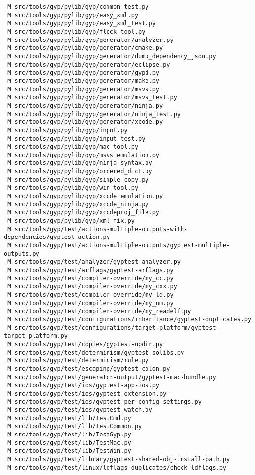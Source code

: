 \documentclass{article}
\begin{document}
\begin{verbatim}
 M src/tools/gyp/pylib/gyp/common_test.py
 M src/tools/gyp/pylib/gyp/easy_xml.py
 M src/tools/gyp/pylib/gyp/easy_xml_test.py
 M src/tools/gyp/pylib/gyp/flock_tool.py
 M src/tools/gyp/pylib/gyp/generator/analyzer.py
 M src/tools/gyp/pylib/gyp/generator/cmake.py
 M src/tools/gyp/pylib/gyp/generator/dump_dependency_json.py
 M src/tools/gyp/pylib/gyp/generator/eclipse.py
 M src/tools/gyp/pylib/gyp/generator/gypd.py
 M src/tools/gyp/pylib/gyp/generator/make.py
 M src/tools/gyp/pylib/gyp/generator/msvs.py
 M src/tools/gyp/pylib/gyp/generator/msvs_test.py
 M src/tools/gyp/pylib/gyp/generator/ninja.py
 M src/tools/gyp/pylib/gyp/generator/ninja_test.py
 M src/tools/gyp/pylib/gyp/generator/xcode.py
 M src/tools/gyp/pylib/gyp/input.py
 M src/tools/gyp/pylib/gyp/input_test.py
 M src/tools/gyp/pylib/gyp/mac_tool.py
 M src/tools/gyp/pylib/gyp/msvs_emulation.py
 M src/tools/gyp/pylib/gyp/ninja_syntax.py
 M src/tools/gyp/pylib/gyp/ordered_dict.py
 M src/tools/gyp/pylib/gyp/simple_copy.py
 M src/tools/gyp/pylib/gyp/win_tool.py
 M src/tools/gyp/pylib/gyp/xcode_emulation.py
 M src/tools/gyp/pylib/gyp/xcode_ninja.py
 M src/tools/gyp/pylib/gyp/xcodeproj_file.py
 M src/tools/gyp/pylib/gyp/xml_fix.py
 M src/tools/gyp/test/actions-multiple-outputs-with-dependencies/gyptest-action.py
 M src/tools/gyp/test/actions-multiple-outputs/gyptest-multiple-outputs.py
 M src/tools/gyp/test/analyzer/gyptest-analyzer.py
 M src/tools/gyp/test/arflags/gyptest-arflags.py
 M src/tools/gyp/test/compiler-override/my_cc.py
 M src/tools/gyp/test/compiler-override/my_cxx.py
 M src/tools/gyp/test/compiler-override/my_ld.py
 M src/tools/gyp/test/compiler-override/my_nm.py
 M src/tools/gyp/test/compiler-override/my_readelf.py
 M src/tools/gyp/test/configurations/inheritance/gyptest-duplicates.py
 M src/tools/gyp/test/configurations/target_platform/gyptest-target_platform.py
 M src/tools/gyp/test/copies/gyptest-updir.py
 M src/tools/gyp/test/determinism/gyptest-solibs.py
 M src/tools/gyp/test/determinism/rule.py
 M src/tools/gyp/test/escaping/gyptest-colon.py
 M src/tools/gyp/test/generator-output/gyptest-mac-bundle.py
 M src/tools/gyp/test/ios/gyptest-app-ios.py
 M src/tools/gyp/test/ios/gyptest-extension.py
 M src/tools/gyp/test/ios/gyptest-per-config-settings.py
 M src/tools/gyp/test/ios/gyptest-watch.py
 M src/tools/gyp/test/lib/TestCmd.py
 M src/tools/gyp/test/lib/TestCommon.py
 M src/tools/gyp/test/lib/TestGyp.py
 M src/tools/gyp/test/lib/TestMac.py
 M src/tools/gyp/test/lib/TestWin.py
 M src/tools/gyp/test/library/gyptest-shared-obj-install-path.py
 M src/tools/gyp/test/linux/ldflags-duplicates/check-ldflags.py

\end{verbatim}
\end{document}
